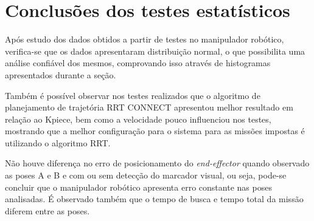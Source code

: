 








\section{Conclusões dos testes estatísticos}

Após estudo dos dados obtidos a partir de testes no manipulador robótico, verifica-se que os dados apresentaram distribuição normal, o que possibilita uma análise confiável dos mesmos, comprovando isso através de histogramas apresentados durante a seção. 

Também é possível observar nos testes realizados que o algoritmo de planejamento de trajetória RRT CONNECT apresentou melhor resultado em relação ao Kpiece, bem como a velocidade pouco influenciou nos testes, mostrando que a melhor configuração para o sistema para as missões impostas é utilizando o algoritmo RRT. 

Não houve diferença no erro de posicionamento do \textit{end-effector} quando observado as poses A e B e com ou sem detecção do marcador visual, ou seja, pode-se concluir que o manipulador robótico apresenta erro constante nas poses analisadas. É observado também que o tempo de busca e tempo total da missão diferem entre as poses. 

